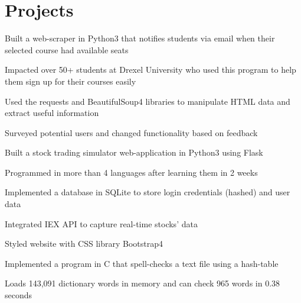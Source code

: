 \documentclass[]{deedy-resume-openfont}
\begin{document}
\begin{minipage}[t]{0.66\textwidth}
\section{Projects}
\begin{tightemize}
\item Built a web-scraper in Python3 that notifies students via email when their selected course had available seats
\item Impacted over 50+ students at Drexel University who used this program to help them sign up for their courses easily
\item Used the requests and BeautifulSoup4 libraries to manipulate HTML data and extract useful information
\item Surveyed potential users and changed functionality based on feedback
\end{tightemize}
\sectionsep

\begin{tightemize}
\item Built a stock trading simulator web-application in Python3 using Flask
\item Programmed in more than 4 languages after learning them in 2 weeks
\item Implemented a database in SQLite to store login credentials (hashed) and user data
\item Integrated IEX API to capture real-time stocks' data
\item Styled website with CSS library Bootstrap4
\end{tightemize}
\sectionsep

\begin{tightemize}
\item Implemented a program in C that spell-checks a text file using a hash-table
\item Loads 143,091 dictionary words in memory and can check 965 words in 0.38 seconds
\end{tightemize}
\sectionsep


\end{minipage}
\end{document}
